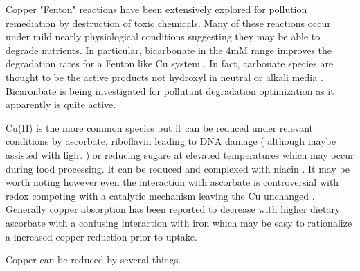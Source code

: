  Copper "Fenton" reactions have been extensively explored
for pollution remediation by destruction of toxic
chemicals. Many of these reactions occur under mild
nearly physiological conditions suggesting they may
be able to degrade nutrients. 
In particular, bicarbonate in the 4mM range improves
the degradation rates for a Fenton like Cu system 
\cite{Peng_Zhang_Zhang_Enhanced_mediated_2019}.
In fact, carbonate species 
are thought to be the active products not hydroxyl
in neutral or alkali media 
\cite{PMID30458276}. Bicaronbate is being investigated
for pollutant degradation optimization \cite{PMID39708608}
as it apparently is quite active. 



Cu(II) is the more common species but it can be reduced
under relevant conditions by ascorbate, riboflavin leading to
DNA damage \cite{PMID8349205}( although maybe assisted with
light \cite{PMID8791088} )  or reducing sugare
at elevated temperatures which may occur during food processing.
It can be reduced and complexed with niacin
\cite{charvv324ska_charvv322y_Interaction_niacin_with_2013}.
It may be worth noting however even the interaction with ascorbate
is controversial with redox competing with a catalytic
mechanism leaving the Cu unchanged
\cite{Shen_Griffiths_Campbell_Ascorbate_oxidation_iron_2021}.
Generally copper absorption has been reported to decrease with
higher dietary ascorbate with a confusing interaction with iron
\cite{Johnson1988} which may be easy to rationalize a increased
copper reduction prior to uptake. 


Copper can be reduced by several things.



